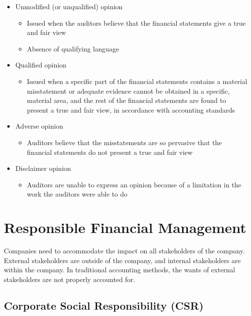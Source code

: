 \documentclass{article}
\begin{document}
			\begin{itemize}
				\item Unmodified (or unqualified) opinion
					\begin{itemize}
						\item Issued when the auditors believe that the financial statements give a true and fair view
						\item Absence of qualifying language
					\end{itemize}
				\item Qualified opinion
					\begin{itemize}
						\item Issued when a specific part of the financial statements contains a material misstatement or adequate evidence cannot be obtained in a specific, material area, and the rest of the financial statements are found to present a true and fair view, in accordance with accounting standards
					\end{itemize}
				\item Adverse opinion
					\begin{itemize}
						\item Auditors believe that the misstatements are so pervasive that the financial statements do not present a true and fair view
					\end{itemize}
				\item Disclaimer opinion
					\begin{itemize}
						\item Auditors are unable to express an opinion because of a limitation in the work the auditors were able to do
					\end{itemize}
			\end{itemize}

\section{Responsible Financial Management}

	Companies need to accommodate the impact on all stakeholders of the company. External stakeholders are outside of the company, and internal stakeholders are within the company. In traditional accounting methods, the wants of external stakeholders are not properly accounted for.

	\subsection{Corporate Social Responsibility (CSR)}
\end{document}
